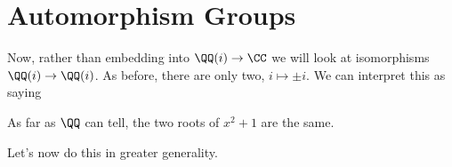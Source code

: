 %

\section{Automorphism Groups}
Now, rather than embedding into $\QQ(i) \to \CC$ we will look at isomorphisms $\QQ(i) \to \QQ(i)$.
As before, there are only two, $i \mapsto \pm i$.
We can interpret this as saying
\begin{moral}
As far as $\QQ$ can tell, the two roots of $x^2+1$ are the same.
\end{moral}
Let's now do this in greater generality.

